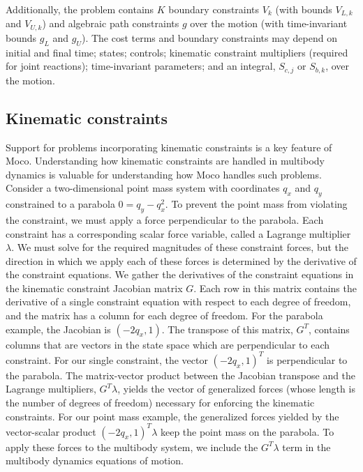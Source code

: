 \documentclass[10pt,letterpaper]{article}
\begin{document}
Additionally, the problem contains $K$ boundary constraints $V_k$ (with bounds $V_{L,k}$ and $V_{U,k}$) and algebraic path constraints $g$ over the motion (with time-invariant bounds $g_L$ and $g_U$). The cost terms and boundary constraints may depend on initial and final time; states; controls; kinematic constraint multipliers (required for joint reactions); time-invariant parameters; and an integral, $S_{c,j}$ or $S_{b,k}$, over the motion.

\subsection*{Kinematic constraints}

Support for problems incorporating kinematic constraints is a key feature of Moco. Understanding how kinematic constraints are handled in multibody dynamics is valuable for understanding how Moco handles such problems. Consider a two-dimensional point mass system with coordinates $q_x$ and $q_y$ constrained to a parabola $0 = q_y - q_x^2$. To prevent the point mass from violating the constraint, we must apply a force perpendicular to the parabola. Each constraint has a corresponding scalar force variable, called a Lagrange multiplier $\lambda$. We must solve for the required magnitudes of these constraint forces, but the direction in which we apply each of these forces is determined by the derivative of the constraint equations. We gather the derivatives of the constraint equations in the kinematic constraint Jacobian matrix $G$. Each row in this matrix contains the derivative of a single constraint equation with respect to each degree of freedom, and the matrix has a column for each degree of freedom. For the parabola example, the Jacobian is $( -2q_x, 1)$. The transpose of this matrix, $G^T$, contains columns that are vectors in the state space which are perpendicular to each constraint. For our single constraint, the vector $(-2q_x, 1)^T$ is perpendicular to the parabola. The matrix-vector product between the Jacobian transpose and the Lagrange multipliers, $G^T \lambda$, yields the vector of generalized forces (whose length is the number of degrees of freedom) necessary for enforcing the kinematic constraints. For our point mass example, the generalized forces yielded by the vector-scalar product  $(-2q_x, 1)^T \lambda$ keep the point mass on the parabola. To apply these forces to the multibody system, we include the $G^T \lambda$ term in the multibody dynamics equations of motion.
\end{document}
